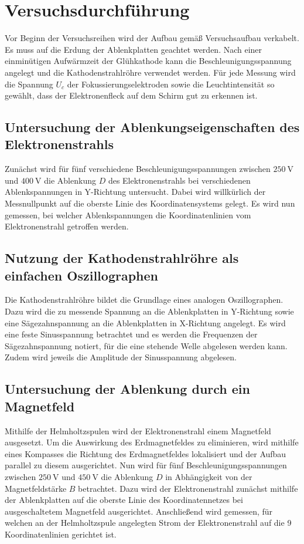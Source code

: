 \section{Versuchsdurchführung}
Vor Beginn der Versuchsreihen wird der Aufbau gemäß Versuchsaufbau verkabelt.
Es muss auf die Erdung der Ablenkplatten geachtet werden.
Nach einer einminütigen Aufwärmzeit der Glühkathode kann die Beschleunigungsspannung angelegt und die Kathodenstrahlröhre verwendet werden.
Für jede Messung wird die Spannung $U_c$ der Fokussierungselektroden sowie die Leuchtintensität so gewählt, dass der Elektronenfleck auf dem Schirm gut zu erkennen ist.
\subsection{Untersuchung der Ablenkungseigenschaften des Elektronenstrahls}
Zunächst wird für fünf verschiedene Beschleunigungsspannungen zwischen $\SI{250}{\volt}$ und $\SI{400}{\volt}$ die Ablenkung $D$ des Elektronenstrahls bei verschiedenen Ablenkspannungen in Y-Richtung untersucht.
Dabei wird willkürlich der Messnullpunkt auf die oberste Linie des Koordinatensystems gelegt.
Es wird nun gemessen, bei welcher Ablenkspannungen die Koordinatenlinien vom Elektronenstrahl getroffen werden.
\subsection{Nutzung der Kathodenstrahlröhre als einfachen Oszillographen}
Die Kathodenstrahlröhre bildet die Grundlage eines analogen Oszillographen.
Dazu wird die zu messende Spannung an die Ablenkplatten in Y-Richtung sowie eine Sägezahnspannung an die Ablenkplatten in X-Richtung angelegt.
Es wird eine feste Sinusspannung betrachtet und es werden die Frequenzen der Sägezahnspannung notiert, für die eine stehende Welle abgelesen werden kann.
Zudem wird jeweils die Amplitude der Sinusspannung abgelesen.
\label{sec:durchführung}
\subsection{Untersuchung der Ablenkung durch ein Magnetfeld}
Mithilfe der Helmholtzspulen wird der Elektronenstrahl einem Magnetfeld ausgesetzt.
Um die Auswirkung des Erdmagnetfeldes zu eliminieren, wird mithilfe eines Kompasses die Richtung des Erdmagnetfeldes lokalisiert und der Aufbau parallel zu diesem ausgerichtet.
Nun wird für fünf Beschleunigungsspannungen zwischen $\SI{250}{\volt}$ und $\SI{450}{\volt}$ die Ablenkung $D$ in Abhängigkeit von der Magnetfeldstärke $B$ betrachtet.
Dazu wird der Elektronenstrahl zunächst mithilfe der Ablenkplatten auf die oberste Linie des Koordinatennetzes bei ausgeschaltetem Magnetfeld ausgerichtet.
Anschließend wird gemessen, für welchen an der Helmholtzspule angelegten Strom der Elektronenstrahl auf die 9 Koordinatenlinien gerichtet ist.
